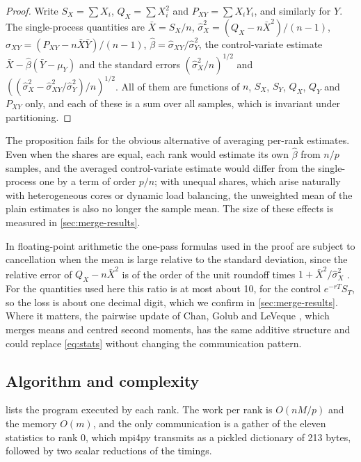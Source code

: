 \documentclass[11pt,a4paper]{article}
\begin{document}
\begin{proof}
Write $S_X = \sum X_i$, $Q_X = \sum X_i^2$ and $P_{XY} = \sum X_iY_i$, and similarly for $Y$.
The single-process quantities are $\bar X = S_X/n$, $\hat\sigma_X^2 = (Q_X - n\bar X^2)/(n-1)$, $\hat\sigma_{XY} = (P_{XY} - n\bar X\bar Y)/(n-1)$, $\hat\beta = \hat\sigma_{XY}/\hat\sigma_Y^2$, the control-variate estimate $\bar X - \hat\beta(\bar Y-\mu_Y)$ and the standard errors $(\hat\sigma_X^2/n)^{1/2}$ and $((\hat\sigma_X^2 - \hat\sigma_{XY}^2/\hat\sigma_Y^2)/n)^{1/2}$.
All of them are functions of $n$, $S_X$, $S_Y$, $Q_X$, $Q_Y$ and $P_{XY}$ only, and each of these is a sum over all samples, which is invariant under partitioning.
\end{proof}

The proposition fails for the obvious alternative of averaging per-rank estimates.
Even when the shares are equal, each rank would estimate its own $\hat\beta$ from $n/p$ samples, and the averaged control-variate estimate would differ from the single-process one by a term of order $p/n$; with unequal shares, which arise naturally with heterogeneous cores or dynamic load balancing, the unweighted mean of the plain estimates is also no longer the sample mean.
The size of these effects is measured in \cref{sec:merge-results}.

In floating-point arithmetic the one-pass formulas used in the proof are subject to cancellation when the mean is large relative to the standard deviation, since the relative error of $Q_X - n\bar X^2$ is of the order of the unit roundoff times $1+\bar X^2/\hat\sigma_X^2$ \citep{chan1983}.
For the quantities used here this ratio is at most about 10, for the control $e^{-rT}S_T$, so the loss is about one decimal digit, which we confirm in \cref{sec:merge-results}.
Where it matters, the pairwise update of Chan, Golub and LeVeque \citep{chan1983}, which merges means and centred second moments, has the same additive structure and could replace \cref{eq:stats} without changing the communication pattern.

\subsection{Algorithm and complexity}\label{sec:alg}

 lists the program executed by each rank.
The work per rank is $O(nM/p)$ and the memory $O(m)$, and the only communication is a gather of the eleven statistics to rank 0, which mpi4py transmits as a pickled dictionary of 213 bytes, followed by two scalar reductions of the timings.
\end{document}

